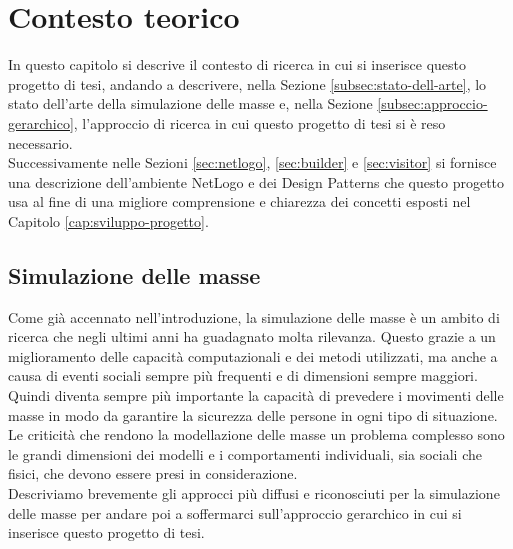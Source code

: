 \chapter{Contesto teorico}
In questo capitolo si descrive il contesto di ricerca in cui si inserisce questo progetto di tesi, andando a descrivere, nella Sezione \ref{subsec:stato-dell-arte}, lo stato dell'arte della simulazione delle masse e, nella Sezione \ref{subsec:approccio-gerarchico}, l'approccio di ricerca in cui questo progetto di tesi si è reso necessario.\\
Successivamente nelle Sezioni \ref{sec:netlogo}, \ref{sec:builder} e \ref{sec:visitor} si fornisce una descrizione dell'ambiente NetLogo e dei Design Patterns che questo progetto usa al fine di una migliore comprensione e chiarezza dei concetti esposti nel Capitolo \ref{cap:sviluppo-progetto}.
\section{Simulazione delle masse}
\label{sec:simulazione-masse}
Come già accennato nell'introduzione, la simulazione delle masse è un ambito di ricerca che negli ultimi anni ha guadagnato molta rilevanza. Questo grazie a un miglioramento delle capacità computazionali e dei metodi utilizzati, ma anche a causa di eventi sociali sempre più frequenti e di dimensioni sempre maggiori. Quindi diventa sempre più importante la capacità di prevedere i movimenti delle masse in modo da garantire la sicurezza delle persone in ogni tipo di situazione.\\
Le criticità che rendono la modellazione delle masse un problema complesso sono le grandi dimensioni dei modelli e i comportamenti individuali, sia sociali che fisici, che devono essere presi in considerazione.\\
Descriviamo brevemente gli approcci più diffusi e riconosciuti per la simulazione delle masse per andare poi a soffermarci sull'approccio gerarchico in cui si inserisce questo progetto di tesi.
